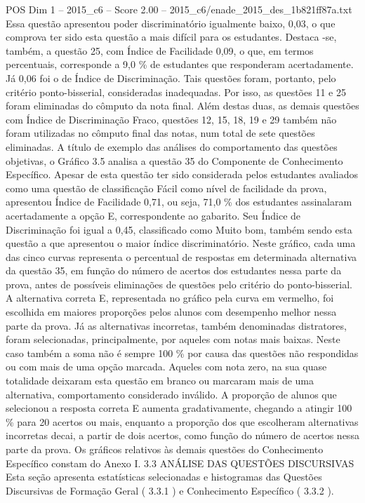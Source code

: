 \begin{textsample}{POS Dim 1 – 2015\_c6 – Score 2.00 – 2015\_c6/enade\_2015\_des\_1b821ff87a.txt}
Essa questão apresentou poder discriminatório igualmente baixo, 0,03, o que comprova ter sido esta questão a mais difícil para os estudantes.
Destaca -se, também, a questão 25, com Índice de Facilidade 0,09, o que, em termos percentuais, corresponde a 9,0 \% de estudantes que responderam acertadamente.
Já 0,06 foi o de Índice de Discriminação.
Tais questões foram, portanto, pelo critério ponto-bisserial, consideradas inadequadas.
Por isso, as questões 11 e 25 foram eliminadas do cômputo da nota final.
Além destas duas, as demais questões com Índice de Discriminação Fraco, questões 12, 15, 18, 19 e 29 também não foram utilizadas no cômputo final das notas, num total de sete questões eliminadas.
A título de exemplo das análises do comportamento das questões objetivas, o Gráfico 3.5 analisa a questão 35 do Componente de Conhecimento Específico.
Apesar de esta questão ter sido considerada pelos estudantes avaliados como uma questão de classificação Fácil como nível de facilidade da prova, apresentou Índice de Facilidade 0,71, ou seja, 71,0 \% dos estudantes assinalaram acertadamente a opção E, correspondente ao gabarito.
Seu Índice de Discriminação foi igual a 0,45, classificado como Muito bom, também sendo esta questão a que apresentou o maior índice discriminatório.
Neste gráfico, cada uma das cinco curvas representa o percentual de respostas em determinada alternativa da questão 35, em função do número de acertos dos estudantes nessa parte da prova, antes de possíveis eliminações de questões pelo critério do ponto-bisserial.
A alternativa correta E, representada no gráfico pela curva em vermelho, foi escolhida em maiores proporções pelos alunos com desempenho melhor nessa parte da prova.
Já as alternativas incorretas, também denominadas distratores, foram selecionadas, principalmente, por aqueles com notas mais baixas.
Neste caso também a soma não é sempre 100 \% por causa das questões não respondidas ou com mais de uma opção marcada.
Aqueles com nota zero, na sua quase totalidade deixaram esta questão em branco ou marcaram mais de uma alternativa, comportamento considerado inválido.
A proporção de alunos que selecionou a resposta correta E aumenta gradativamente, chegando a atingir 100 \% para 20 acertos ou mais, enquanto a proporção dos que escolheram alternativas incorretas decai, a partir de dois acertos, como função do número de acertos nessa parte da prova.
Os gráficos relativos às demais questões do Conhecimento Específico constam do Anexo I. 3.3 ANÁLISE DAS QUESTÕES DISCURSIVAS Esta seção apresenta estatísticas selecionadas e histogramas das Questões Discursivas de Formação Geral ( 3.3.1 ) e Conhecimento Específico ( 3.3.2 ).

\end{textsample}
